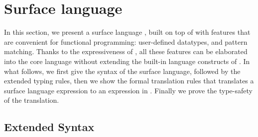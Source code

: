 \newcommand{\FV}{\mathsf{FV}}
\newcommand{\dom}{\mathsf{dom}}

\section{Surface language}
\label{sec:surface}


In this section, we present a surface language \sufcc, built on top of
\name with features that are convenient for functional programming:
user-defined datatypes, and pattern matching. Thanks to the
expressiveness of \name, all these features can be elaborated into the
core language without extending the built-in language constructs of
\name. In what follows, we first give the syntax of the surface
language, followed by the extended typing rules, then we show the
formal translation rules that translates a surface language expression
to an expression in \name. Finally we prove the type-safety of the
translation.

\subsection{Extended Syntax}


